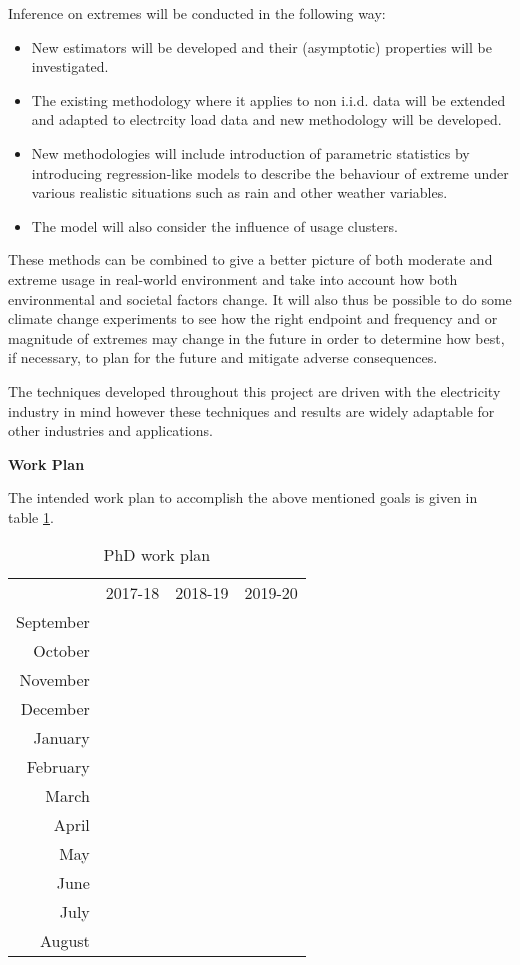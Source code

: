 \documentclass[a4paper]{article}
\begin{document}
\noindent Inference on extremes will be conducted in the following way:
\begin{itemize}
\item New estimators will be developed and their (asymptotic) properties will be investigated.
\item The existing methodology where it applies to non i.i.d. data will be extended and adapted to electrcity load data and new methodology will be developed.
\item New methodologies will include introduction of parametric statistics by introducing regression-like models to describe the behaviour of extreme under various realistic situations such as rain and other weather variables.
\item The model will also consider the influence of usage clusters.
\end{itemize}

These methods can be combined to give a better picture of both moderate and extreme usage in real-world environment and take into account how both environmental and societal factors change. It will also thus be possible to do some climate change experiments to see how the right endpoint and frequency and or magnitude of extremes may change in the future in order to determine how best, if necessary, to plan for the future and mitigate adverse consequences.

The techniques developed throughout this project are driven with the electricity industry in mind however these techniques and results are widely adaptable for other industries and applications. \newline

\noindent \textbf{Work Plan}

The intended work plan to accomplish the above mentioned goals is given in table \ref{tab:workplan}.

\begin{table}
\centering
\begin{tabular}{|r|c|c|c|}
\hline
 & 2017-18 & 2018-19 & 2019-20 \\
\hhline{|=|=|=|=|}
September &  &  &  \\ \hline
October &  &  &  \\ \hline
November &  &  &  \\ \hline
December &  &  &  \\ \hline
January &  &  &  \\ \hline
February &  &  &  \\ \hline
March &  &  &  \\ \hline
April &  &  &  \\ \hline
May &  &  &  \\ \hline
June &  &  &  \\ \hline
July &  &  &  \\ \hline
August &  &  &  \\ \hline
\end{tabular}
\caption{PhD work plan}
\label{tab:workplan}
\end{table}



\end{document}
